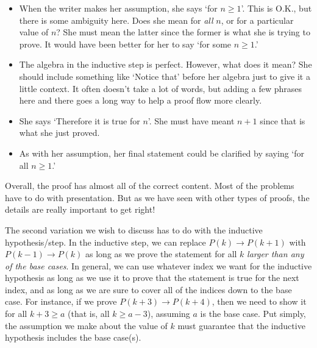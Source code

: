 \begin{eval}
\begin{answer}
\begin{itemize}
The $U$ method can sometimes apply to inequalities as well.
\item
When the writer makes her assumption, she says `for $n\geq 1$'.  This is O.K., but there is some ambiguity
here.  Does she mean for {\em all} $n$, or for a particular value of $n$?  She must mean the latter since
the former is what she is trying to prove.  It would have been better for her to say `for some $n\geq 1$.'
\item
The algebra in the inductive step is perfect.  However, what does it mean?  She should include something like
`Notice that' before her algebra just to give it a little context.  It often doesn't take a lot of words,
but adding a few phrases here and there goes a long way to help a proof flow more clearly.
\item
She says `Therefore it is true for $n$'.  She must have meant $n+1$ since that is what she just proved.
\item
As with her assumption, her final statement could be clarified by saying `for all $n\geq 1$.'
\end{itemize}
Overall, the proof has almost all of the correct content.  
Most of the problems have to do with presentation.
But as we have seen with
other types of proofs, 
the details are really important to get right!
\end{answer}
\end{eval}

\vspace*{.125in}
The second variation we wish to discuss has to do with the inductive hypothesis/step.
In the inductive step, we can replace 
$P(k)\rightarrow P(k+1)$ with 
$P(k-1)\rightarrow P(k)$ as long as we prove the statement
for all $k$ {\em larger than any of the base cases}.
In general, we can use whatever index we want for the inductive hypothesis as long as we use it to prove that the statement
is true for the next index, and as long as we are sure to
cover all of the indices down to the base case.
For instance, if we prove $P(k+3)\rightarrow P(k+4)$, then
we need to show it for all $k+3\geq a$ (that is, all $k\geq a-3$), assuming $a$ is the base case.
Put simply, the assumption we make about the value of $k$
must guarantee that the inductive hypothesis includes the base case(s).




